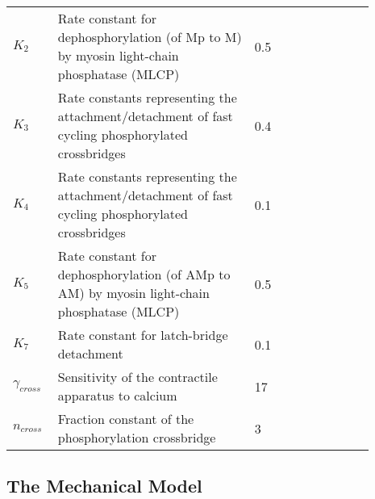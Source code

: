 \begin{table}[h!]
\centering
\begin{tabular}{ p{0.09\linewidth}  >{\footnotesize} p{0.5\linewidth}  >{\footnotesize} p{0.27\linewidth} >{\footnotesize} p{0.03\linewidth} }
\hline
$K_{2}$      	& Rate constant for dephosphorylation (of Mp to M) by myosin light-chain phosphatase (MLCP)																			 & 0.5 \pers & \cite{Hai1989} \\
$K_{3}$      	& Rate constants representing the attachment/detachment of fast cycling phosphorylated crossbridges																	 & 0.4 \pers	& \cite{Hai1989} \\
$K_{4}$      	& Rate constants representing the attachment/detachment of fast cycling phosphorylated crossbridges 																	 & 0.1 \pers	& \cite{Hai1989} \\
$K_{5}$      & Rate constant for dephosphorylation (of AMp to AM) by myosin light-chain phosphatase (MLCP)																			 & 0.5 \pers	& \cite{Hai1989} \\
$K_{7}$      	& Rate constant for latch-bridge detachment					& 0.1 \pers	& \cite{Hai1989} \\
$\gamma_{cross}$      	& Sensitivity of the contractile apparatus to calcium		& 17 \puMdries	& \cite{Koenigsberger2005} \\
$n_{cross}$      		& Fraction constant of the phosphorylation crossbridge				& 3 \Dless	& \cite{Koenigsberger2005} \\
\hline
\end{tabular}
\label{tab:crossbridge}
\end{table}

\subsection{The Mechanical Model}

